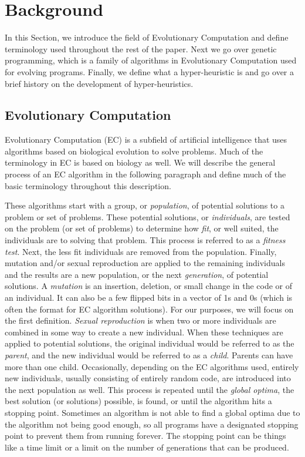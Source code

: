 \documentclass{sig-alternate}
\begin{document}
\section{Background}
\label{sec:background}
In this Section, we introduce the field of Evolutionary Computation and define terminology used throughout the rest of the paper. Next we go over genetic programming, which is a family of algorithms in Evolutionary Computation used for evolving programs. Finally, we define what a hyper-heuristic is and go over a brief history on the development of hyper-heuristics. 
\subsection{Evolutionary Computation}
\label{sec:evocomp}
Evolutionary Computation (EC) is a subfield of artificial intelligence that uses algorithms based on biological evolution to solve problems. Much of the terminology in EC is based on biology as well. We will describe the general process of an EC algorithm in the following paragraph and define much of the basic terminology throughout this description.

These algorithms start with a group, or \textit{population}, of potential solutions to a problem or set of problems. These potential solutions, or \textit{individuals}, are tested on the problem (or set of problems) to determine how \textit{fit}, or well suited, the individuals are to solving that problem. This process is referred to as a \textit{fitness test}. Next, the less fit individuals are removed from the population. Finally, mutation and/or sexual reproduction are applied to the remaining individuals and the results are a new population, or the next \textit{generation}, of potential solutions. A \textit{mutation} is an insertion, deletion, or small change in the code or of an individual. It can also be a few flipped bits in a vector of 1s and 0s (which is often the format for EC algorithm solutions). For our purposes, we will focus on the first definition. \textit{Sexual reproduction} is when two or more individuals are combined in some way to create a new individual. When these techniques are applied to potential solutions, the original individual would be referred to as the \textit{parent}, and the new individual would be referred to as a \textit{child}. Parents can have more than one child. Occasionally, depending on the EC algorithms used, entirely new individuals, usually consisting of entirely random code, are introduced into the next population as well. This process is repeated until the \textit{global optima}, the best solution (or solutions) possible, is found, or until the algorithm hits a stopping point. Sometimes an algorithm is not able to find a global optima due to the algorithm not being good enough, so all programs have a designated stopping point to prevent them from running forever. The stopping point can be things like a time limit or a limit on the number of generations that can be produced.
\end{document}
